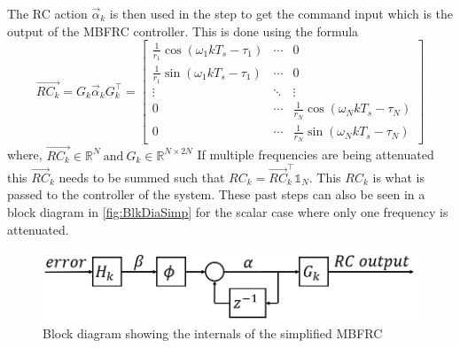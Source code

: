 \documentclass[journal]{IEEEtran}
\begin{document}
The RC action \(\vec\alpha_k\) is then used in the step to get the command input which is the output of the MBFRC controller. This is done using the formula
\begin{subequations}
    
\begin{equation}
        \vec{RC_k} = G_k\vec\alpha_k
\end{equation}
\begin{equation}
        G_k^\top = \begin{bmatrix}
            \frac{1}{r_1}\cos(\omega_1 k T_s-\tau_1)  &\cdots & 0\\
            \frac{1}{r_1}\sin(\omega_1 k T_s-\tau_1)&
        \cdots &0\\
        \vdots&\ddots&\vdots\\
        0&\cdots&\frac{1}{r_N}\cos(\omega_N k T_s-\tau_N)\\
        0&\cdots &\frac{1}{r_N}\sin(\omega_N k T_s-\tau_N)
        \end{bmatrix}
\end{equation}
\end{subequations}
where, $\vec{RC_k}\in\mathbb{R}^N\: \text{and}\:G_k\in\mathbb{R}^{N\times 2N}$ If multiple frequencies are being attenuated this \(\vec{RC}_k\) needs to be summed such that \(RC_k = \vec{RC}_k^\top\mathbb{1}_N\). This $RC_k$ is what is passed to the controller of the system. These past steps can also be seen in a block diagram in \autoref{fig:BlkDiaSimp} for the scalar case where only one frequency is attenuated.

\begin{figure}[!t]
    \centering
    \includegraphics[width=0.9\linewidth]{figures/simple_MBFRC/simple_MBFRC_2.png}
    \caption{Block diagram showing the internals of the simplified MBFRC}
    \label{fig:BlkDiaSimp}
\end{figure}
\end{document}
